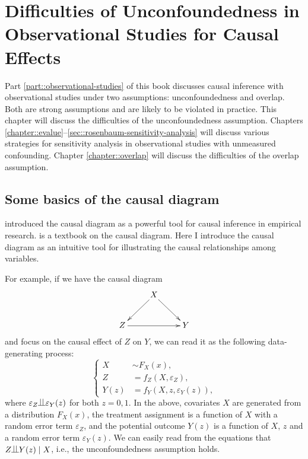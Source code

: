 
\chapter{Difficulties of Unconfoundedness in Observational Studies for Causal Effects}
 \label{chapter::difficulties-observational-studies}
 
 
Part \ref{part::observational-studies} of this book discusses causal inference with observational studies under two assumptions: unconfoundedness and overlap. Both are strong assumptions and are likely to be violated in practice. This chapter will discuss the difficulties of the unconfoundedness assumption.  Chapters \ref{chapter::evalue}--\ref{sec::rosenbaum-sensitivity-analysis} will discuss various strategies for sensitivity analysis in observational studies with unmeasured confounding. Chapter \ref{chapter::overlap}  will discuss the difficulties of the overlap assumption. 
 
 
 

\section{Some basics of the causal diagram}


\citet{pearl1995causal} introduced the causal diagram as a powerful tool for causal inference in empirical research. 
\citet{pearl2000causality} is a textbook on the causal diagram. Here I introduce the causal diagram as an intuitive tool for illustrating the causal relationships among variables. 

For example, if we have the causal diagram
$$
\xymatrix{
 & X \ar[ld]\ar[rd] \\
Z\ar[rr] &&Y 
}
$$
and focus on the causal effect of $Z$ on $Y$,
we can read it as the following data-generating process: 
$$
\left\{ 
\begin{aligned}
      X & \sim F_X(x), \\
      Z  &=   f_Z(X, \varepsilon_Z) , \\
      Y(z) &=  f_Y(X, z, \varepsilon_Y(z)) ,
\end{aligned}
\right. 
$$
where $\varepsilon_Z \ind \varepsilon_Y(z)$ for both $z=0,1$. 
In the above,  covariates $X$ are generated from a distribution  $F_X(x)$, the treatment assignment is a function of $X$ with a random error term $\varepsilon_Z$, and the potential outcome $ Y(z) $ is a function of $X$, $z$ and a random error term $\varepsilon_Y(z)$. We can easily read from the equations that $Z\ind Y(z) \mid X$, i.e., the unconfoundedness assumption holds. 


